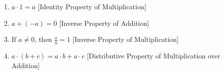 \documentclass[crop=false,class=article,oneside]{standalone}
\begin{document}
\begin{properties}
\begin{enumerate}
{                        add_identity
                    }
                    $a+0=a$\hfill%
                    [Identity Property of Addition]
                \item
                    \label{%
                        property:%
                        north_shore_arithmetic_properties_%
                        mult_identity%
                    }
                    ${a}\cdot{1}=a$\hfill
                    [Identity Property of Multiplication]
                \item
                    \label{%
                        property:%
                        north_shore_arithmetic_properties_%
                        add_inverse%
                    }
                    $a+(-a)=0$\hfill
                    [Inverse Property of Addition]
                \item
                    \label{%
                        property:%
                        north_shore_arithmetic_properties_%
                        mult_inverse%
                    }
                    If ${a}\ne{0}$, then $\frac{a}{a}=1$\hfill
                    [Inverse Property of Multiplication]
                \item
                    \label{%
                        property:%
                        north_shore_arithmetic_properties_%
                        distributive_property%
                    }
                    ${a}\cdot{(b+c)}%
                     ={a}\cdot{b}+{a}\cdot{c}$\hfill
                    [Distributive Property of
                     Multiplication over Addition]
            \end{enumerate}
        \end{properties}
\end{document}
